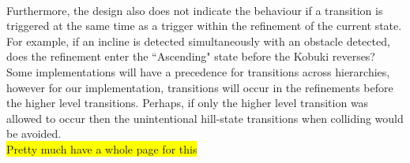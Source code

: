 \paragraph{}
Furthermore, the design also does not indicate the behaviour if a transition is triggered at the same time as a trigger within the refinement of the current state. For example, if an incline is detected simultaneously with an obstacle detected, does the refinement enter the ``Ascending" state before the Kobuki reverses? Some implementations will have a precedence for transitions across hierarchies, however for our implementation, transitions will occur in the refinements before the higher level transitions. Perhaps, if only the higher level transition was allowed to occur then the unintentional hill-state transitions when colliding would be avoided.
\\
\colorbox{yellow}{Pretty much have a whole page for this}